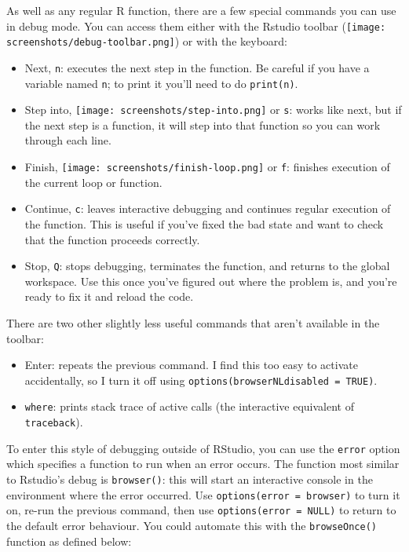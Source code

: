 As well as any regular R function, there are a few special commands you
can use in debug mode. You can access them either with the Rstudio
toolbar (\texttt{[image: screenshots/debug-toolbar.png]})
or with the keyboard:

\begin{itemize}
\item
  Next, \texttt{n}: executes the next step in the function. Be careful
  if you have a variable named \texttt{n}; to print it you'll need to do
  \texttt{print(n)}.
\item
  Step into, \texttt{[image: screenshots/step-into.png]}
  or \texttt{s}: works like next, but if the next step is a function, it
  will step into that function so you can work through each line.
\item
  Finish, \texttt{[image: screenshots/finish-loop.png]} or
  \texttt{f}: finishes execution of the current loop or function.
\item
  Continue, \texttt{c}: leaves interactive debugging and continues
  regular execution of the function. This is useful if you've fixed the
  bad state and want to check that the function proceeds correctly.
\item
  Stop, \texttt{Q}: stops debugging, terminates the function, and
  returns to the global workspace. Use this once you've figured out
  where the problem is, and you're ready to fix it and reload the code.
\end{itemize}

There are two other slightly less useful commands that aren't available
in the toolbar:

\begin{itemize}
\item
  Enter: repeats the previous command. I find this too easy to activate
  accidentally, so I turn it off using
  \texttt{options(browserNLdisabled = TRUE)}.
\item
  \texttt{where}: prints stack trace of active calls (the interactive
  equivalent of \texttt{traceback}).
\end{itemize}

To enter this style of debugging outside of RStudio, you can use the
\texttt{error} option which specifies a function to run when an error
occurs. The function most similar to Rstudio's debug is
\texttt{browser()}: this will start an interactive console in the
environment where the error occurred. Use
\texttt{options(error = browser)} to turn it on, re-run the previous
command, then use \texttt{options(error = NULL)} to return to the
default error behaviour. You could automate this with the
\texttt{browseOnce()} function as defined below: 


